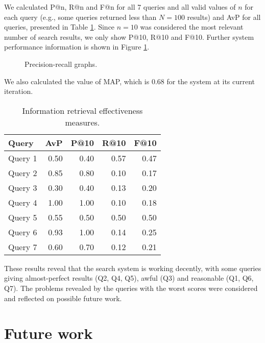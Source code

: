 \documentclass[sigconf, authorversion]{acmart}
\begin{document}
We calculated P@n, R@n and F@n for all 7 queries and all valid values of $n$ for each query (e.g., some queries returned less than $N=100$ results) and AvP for all queries, presented in Table \ref{tab:ir-quality}. Since $n=10$ was considered the most relevant number of search results, we only show P@10, R@10 and F@10. Further system performance information is shown in Figure \ref{fig:recall-precision-graphs}.

\begin{figure}[ht]
    \centering
    
    
    \caption{Precision-recall graphs.} \label{fig:recall-precision-graphs}
\end{figure}

We also calculated the value of MAP, which is 0.68 for the system at its current iteration.

\begin{table}[ht]
    \centering
    \caption{Information retrieval effectiveness measures.} \label{tab:ir-quality}
    \begin{tabular}{@{}l|r r r r@{}}
        \textbf{Query}   & AvP  & P@10 & R@10 & F@10 \\ \hline
        Query 1          & 0.50 & 0.40 & 0.57 & 0.47 \\
        Query 2          & 0.85 & 0.80 & 0.10 & 0.17 \\
        Query 3          & 0.30 & 0.40 & 0.13 & 0.20 \\
        Query 4          & 1.00 & 1.00 & 0.10 & 0.18 \\
        Query 5          & 0.55 & 0.50 & 0.50 & 0.50 \\
        Query 6          & 0.93 & 1.00 & 0.14 & 0.25 \\
        Query 7          & 0.60 & 0.70 & 0.12 & 0.21 \\
    \end{tabular}
\end{table}

These results reveal that the search system is working decently, with some queries giving almost-perfect results (Q2, Q4, Q5), awful (Q3) and reasonable (Q1, Q6, Q7). The problems revealed by the queries with the worst scores were considered and reflected on possible future work.

\section{Future work}
\end{document}
